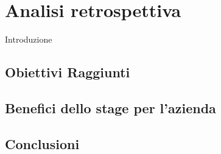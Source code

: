 
\chapter{Analisi retrospettiva}
\label{cap:analisi-retrospettiva}

Introduzione


\section{Obiettivi Raggiunti}


\section{Benefici dello stage per l'azienda}

\section{Conclusioni}